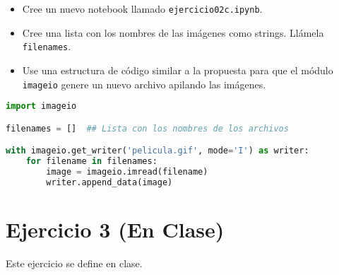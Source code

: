 \documentclass{article}
\begin{document}
\begin{itemize}
    \item Cree un nuevo notebook llamado \texttt{ejercicio02c.ipynb}.
    \item Cree una lista con los nombres de las imágenes como strings. Llámela  \texttt{filenames}.
    \item Use una estructura de código similar a la propuesta para que el módulo \texttt{imageio} genere un nuevo archivo apilando las imágenes.
\end{itemize}




\begin{lstlisting}[language=Python, caption=ejercicio02x.ipynb]
import imageio

filenames = []  ## Lista con los nombres de los archivos

with imageio.get_writer('pelicula.gif', mode='I') as writer:
    for filename in filenames:
        image = imageio.imread(filename)
        writer.append_data(image)
\end{lstlisting}

\section*{Ejercicio 3 (En Clase)}
Este ejercicio se define en clase.
\end{document}
